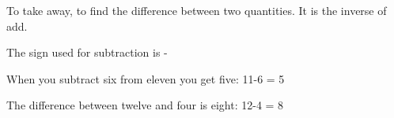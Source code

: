 To take away, to find the difference between two quantities.
It is the inverse of add.
\par
The sign used for subtraction is -
\par
When you subtract six from eleven you get five: 11-6 = 5 
\par
The difference between twelve and four is eight: 12-4 = 8